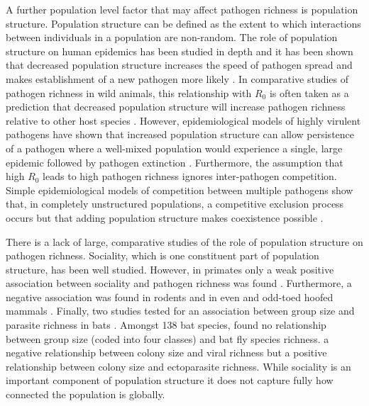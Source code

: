 A further population level factor that may affect pathogen richness is population structure.
Population structure can be defined as the extent to which interactions between individuals in a population are non-random.
The role of population structure on human epidemics has been studied in depth and it has been shown that decreased population structure increases the speed of pathogen spread and makes establishment of a new pathogen more likely \cite{colizza2007invasion, vespignani2008reaction}.
In comparative studies of pathogen richness in wild animals, this relationship with $R_0$ is often taken as a prediction that decreased population structure will increase pathogen richness relative to other host species \cite{nunn2003comparative, morand2000wormy, poulin2014parasite, poulin2000diversity, altizer2003social}. 
However, epidemiological models of highly virulent pathogens have shown that increased population structure can allow persistence of a pathogen where a well-mixed population would experience a single, large epidemic followed by pathogen extinction \cite{blackwood2013resolving, plowright2011urban}.
Furthermore, the assumption that high $R_0$ leads to high pathogen richness ignores inter-pathogen competition.
Simple epidemiological models of competition between multiple pathogens show that, in completely unstructured populations, a competitive exclusion process occurs but that adding population structure makes coexistence possible \cite{qiu2013vector, allen2004sis, nunes2006localized}.




There is a lack of large, comparative studies of the role of population structure on pathogen richness.
Sociality, which is one constituent part of population structure, has been well studied.
However, in primates only a weak positive association between sociality and pathogen richness was found \cite{vitone2004body}.
Furthermore, a negative association was found in rodents \cite{bordes2007rodent} and in even and odd-toed hoofed mammals \cite{ezenwa2006host}.
Finally, two studies tested for an association between group size and parasite richness in bats \cite{bordes2008bat, gay2014parasite}.
Amongst 138 bat species, \textcite{bordes2008bat} found no relationship between group size (coded into four classes) and bat fly species richness.
\textcite{gay2014parasite} a negative relationship between colony size and viral richness but a positive relationship between colony size and ectoparasite richness.
While sociality is an important component of population structure it does not capture fully how connected the population is globally. 



